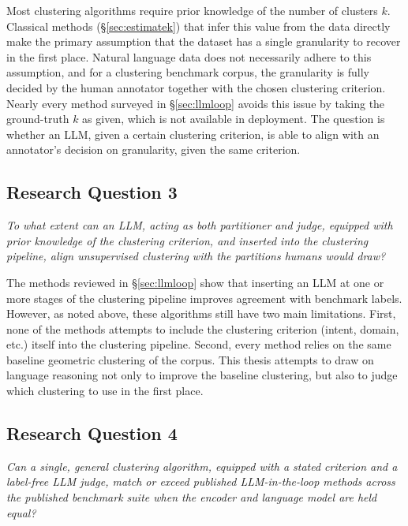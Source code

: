 \documentclass[11pt,a4paper,oneside]{report}
\begin{document}
Most clustering algorithms require prior knowledge of the number of clusters $k$. Classical methods (\S\ref{sec:estimatek}) that infer this value from the data directly make the primary assumption that the dataset has a single granularity to recover in the first place. Natural language data does not necessarily adhere to this assumption, and for a clustering benchmark corpus, the granularity is fully decided by the human annotator together with the chosen clustering criterion. Nearly every method surveyed in \S\ref{sec:llmloop} avoids this issue by taking the ground-truth $k$ as given, which is not available in deployment. The question is whether an LLM, given a certain clustering criterion, is able to align with an annotator's decision on granularity, given the same criterion.

\subsection{Research Question 3}

\emph{To what extent can an LLM, acting as both partitioner and judge, equipped with prior knowledge of the clustering criterion, and inserted into the clustering pipeline, align unsupervised clustering with the partitions humans would draw?}

\vspace{\baselineskip}

The methods reviewed in \S\ref{sec:llmloop} show that inserting an LLM at one or more stages of the clustering pipeline improves agreement with benchmark labels. However, as noted above, these algorithms still have two main limitations. First, none of the methods attempts to include the clustering criterion (intent, domain, etc.) itself into the clustering pipeline. Second, every method relies on the same baseline geometric clustering of the corpus. This thesis attempts to draw on language reasoning not only to improve the baseline clustering, but also to judge which clustering to use in the first place.

\subsection{Research Question 4}

\emph{Can a single, general clustering algorithm, equipped with a stated criterion and a label-free LLM judge, match or exceed published LLM-in-the-loop methods across the published benchmark suite when the encoder and language model are held equal?}
\end{document}
